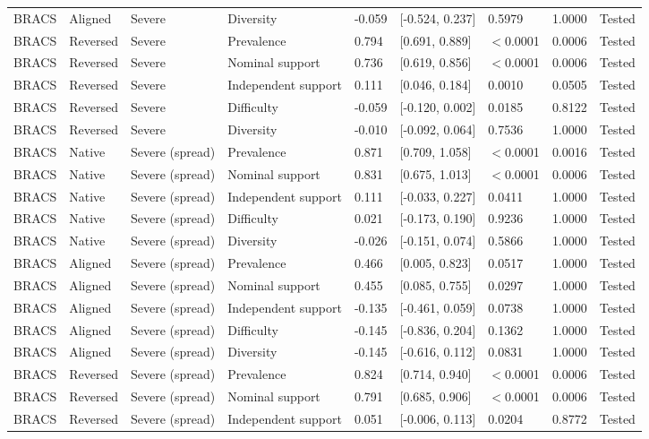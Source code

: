 \begin{longtable}{lllllllll}
BRACS & Aligned & Severe & Diversity & -0.059 & [-0.524, 0.237] & 0.5979 & 1.0000 & Tested \\
BRACS & Reversed & Severe & Prevalence & 0.794 & [0.691, 0.889] & $<$0.0001 & 0.0006 & Tested \\
BRACS & Reversed & Severe & Nominal support & 0.736 & [0.619, 0.856] & $<$0.0001 & 0.0006 & Tested \\
BRACS & Reversed & Severe & Independent support & 0.111 & [0.046, 0.184] & 0.0010 & 0.0505 & Tested \\
BRACS & Reversed & Severe & Difficulty & -0.059 & [-0.120, 0.002] & 0.0185 & 0.8122 & Tested \\
BRACS & Reversed & Severe & Diversity & -0.010 & [-0.092, 0.064] & 0.7536 & 1.0000 & Tested \\
BRACS & Native & Severe (spread) & Prevalence & 0.871 & [0.709, 1.058] & $<$0.0001 & 0.0016 & Tested \\
BRACS & Native & Severe (spread) & Nominal support & 0.831 & [0.675, 1.013] & $<$0.0001 & 0.0006 & Tested \\
BRACS & Native & Severe (spread) & Independent support & 0.111 & [-0.033, 0.227] & 0.0411 & 1.0000 & Tested \\
BRACS & Native & Severe (spread) & Difficulty & 0.021 & [-0.173, 0.190] & 0.9236 & 1.0000 & Tested \\
BRACS & Native & Severe (spread) & Diversity & -0.026 & [-0.151, 0.074] & 0.5866 & 1.0000 & Tested \\
BRACS & Aligned & Severe (spread) & Prevalence & 0.466 & [0.005, 0.823] & 0.0517 & 1.0000 & Tested \\
BRACS & Aligned & Severe (spread) & Nominal support & 0.455 & [0.085, 0.755] & 0.0297 & 1.0000 & Tested \\
BRACS & Aligned & Severe (spread) & Independent support & -0.135 & [-0.461, 0.059] & 0.0738 & 1.0000 & Tested \\
BRACS & Aligned & Severe (spread) & Difficulty & -0.145 & [-0.836, 0.204] & 0.1362 & 1.0000 & Tested \\
BRACS & Aligned & Severe (spread) & Diversity & -0.145 & [-0.616, 0.112] & 0.0831 & 1.0000 & Tested \\
BRACS & Reversed & Severe (spread) & Prevalence & 0.824 & [0.714, 0.940] & $<$0.0001 & 0.0006 & Tested \\
BRACS & Reversed & Severe (spread) & Nominal support & 0.791 & [0.685, 0.906] & $<$0.0001 & 0.0006 & Tested \\
BRACS & Reversed & Severe (spread) & Independent support & 0.051 & [-0.006, 0.113] & 0.0204 & 0.8772 & Tested \\

\end{longtable}
